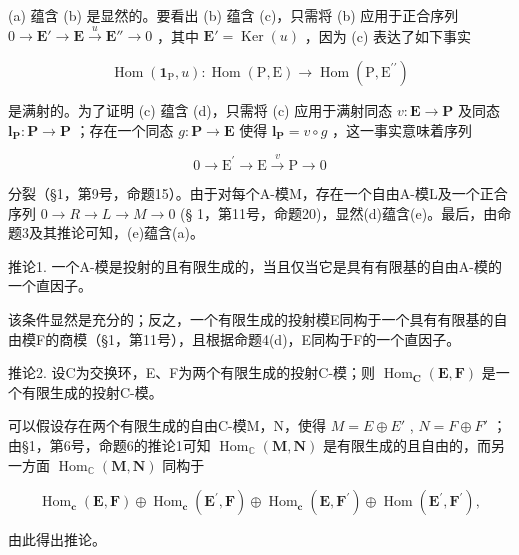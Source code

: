 (a) 蕴含 (b) 是显然的。要看出 (b) 蕴含 (c)，只需将 (b) 应用于正合序列 \(0 \to \mathbf{E}' \to \mathbf{E} \xrightarrow{u} \mathbf{E}'' \to 0\) ，其中 \(\mathbf{E}' = \operatorname{Ker}(u)\) ，因为 (c) 表达了如下事实

\[
\operatorname{Hom} \left(\mathbf {1} _ {\mathrm{P}}, u\right): \operatorname{Hom} (\mathrm{P}, \mathrm{E}) \rightarrow \operatorname{Hom} (\mathrm{P}, \mathrm{E} ^ {\prime \prime})
\]

是满射的。为了证明 (c) 蕴含 (d)，只需将 (c) 应用于满射同态 \(v: \mathbf{E} \to \mathbf{P}\) 及同态 \(\mathbf{l}_{\mathbf{P}}: \mathbf{P} \to \mathbf{P}\) ；存在一个同态 \(g: \mathbf{P} \to \mathbf{E}\) 使得 \(\mathbf{l}_{\mathbf{P}} = v \circ g\) ，这一事实意味着序列

\[
0 \longrightarrow \mathrm{E} ^ {\prime} \longrightarrow \mathrm{E} \stackrel {v} {\longrightarrow} \mathrm{P} \longrightarrow 0
\]

分裂（§1，第9号，命题15）。由于对每个A-模M，存在一个自由A-模L及一个正合序列 \(0 \to R \to L \to M \to 0\) (§ 1，第11号，命题20)，显然(d)蕴含(e)。最后，由命题3及其推论可知，(e)蕴含(a)。

推论1. 一个A-模是投射的且有限生成的，当且仅当它是具有有限基的自由A-模的一个直因子。

该条件显然是充分的；反之，一个有限生成的投射模E同构于一个具有有限基的自由模F的商模（§1，第11号），且根据命题4(d)，E同构于F的一个直因子。

推论2. 设C为交换环，E、F为两个有限生成的投射C-模；则 \(\operatorname{Hom}_{\mathbf{C}}(\mathbf{E}, \mathbf{F})\) 是一个有限生成的投射C-模。

可以假设存在两个有限生成的自由C-模M，N，使得 \(M = E \oplus E'\) , \(N = F \oplus F'\) ；由§1，第6号，命题6的推论1可知 \(\operatorname{Hom}_{\mathbb{C}}(\mathbf{M}, \mathbf{N})\) 是有限生成的且自由的，而另一方面 \(\operatorname{Hom}_{\mathbb{C}}(\mathbf{M}, \mathbf{N})\) 同构于

\[
\operatorname{Hom} _ {\mathbf {c}} (\mathbf {E}, \mathbf {F}) \oplus \operatorname{Hom} _ {\mathbf {c}} (\mathbf {E} ^ {\prime}, \mathbf {F}) \oplus \operatorname{Hom} _ {\mathbf {c}} (\mathbf {E}, \mathbf {F} ^ {\prime}) \oplus \operatorname{Hom} (\mathbf {E} ^ {\prime}, \mathbf {F} ^ {\prime}),
\]

由此得出推论。

